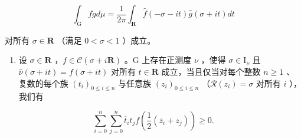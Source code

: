 \[
\int_ {\mathrm{G}} f g d \mu = \frac {1}{2 \pi} \int_ {\mathbf {R}} \widehat {f} (- \sigma - i t) \widehat {g} (\sigma + i t) d t
\]

对所有 \(\sigma\in\mathbf{R}\) （满足 \(0<\sigma<1\) ）成立。

\begin{enumerate}
\def\labelenumi{\alph{enumi})}
\setcounter{enumi}{5}
\tightlist
\item
  设 \(\sigma \in \mathbf{R}\) ，\(f \in \mathcal{C}(\sigma + i\mathbf{R})\) 。G 上存在正测度 \(\nu\) ，使得 \(\sigma \in \mathrm{I}_{\nu}\) 且 \(\widehat{\nu}(\sigma + it) = f(\sigma + it)\) 对所有 \(t \in \mathbf{R}\) 成立，当且仅当对每个整数 \(n \geqslant 1\) 、复数的每个族 \((t_i)_{0 \leqslant i \leqslant n}\) 与任意族 \((z_i)_{0 \leqslant i \leqslant n}\) （\(\mathcal{R}(z_i) = \sigma\) 对所有 \(i\) ），我们有
\end{enumerate}

\[
\sum_ {i = 0} ^ {n} \sum_ {j = 0} ^ {n} \bar {t} _ {i} t _ {j} f \left(\frac {1}{2} (\overline {{z}} _ {i} + z _ {j})\right) \geqslant 0.
\]

